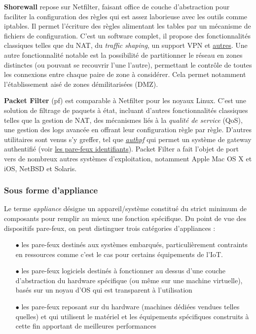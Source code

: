 \documentclass[]{article}
\newcommand{\minit}[1]{\noindent{\small\textbf{ \underline{#1}}}\vspace{0.2cm}}
\begin{document}
\par \textbf{Shorewall} repose sur Netfilter, faisant office de couche d'abstraction pour faciliter la configuration des règles qui est assez laborieuse avec les outils comme iptables. Il permet l'écriture des règles alimentant les tables par un mécanisme de fichiers de configuration. C'est un software complet, il propose des fonctionnalités classiques telles que du NAT, du \textit{traffic shaping}, un support VPN et \href{http://www.shorewall.net/shorewall_features.htm}{autres}. Une autre fonctionnalité notable est la possibilité de partitionner le réseau en zones distinctes (ou pouvant se recouvrir l'une l'autre), permettant le contrôle de toutes les connexions entre chaque paire de zone à considérer. Cela permet notamment l'établissement aisé de zones démilitarisées (DMZ).\\ 

\minit{BSD}  

\par \textbf{Packet Filter} (pf) est comparable à Netfilter pour les noyaux Linux. C'est une solution de filtrage de paquets à état, incluant d'autres fonctionnalités classiques telles que la gestion de NAT, des mécanismes liés à la \textit{qualité de service} (QoS), une gestion des logs avancée en offrant leur configuration règle par règle. D'autres utilitaires sont venus s'y greffer, tel que \href{https://www.openbsd.org/faq/pf/authpf.html}{\textit{authpf}} qui permet un système de gateway authentifié (voir \hyperref[idfw]{les pare-feux identifiants}). Packet Filter a fait l'objet de port vers de nombreux autres systèmes d'exploitation, notamment Apple Mac OS X et iOS, NetBSD et Solaris.

\newpage

\subsubsection{Sous forme d'appliance}

Le terme \textit{appliance} désigne un appareil/système constitué du strict minimum de composants pour remplir au mieux une fonction spécifique. Du point de vue des dispositifs pare-feux, on peut distinguer trois catégories d'appliances :
\begin{itemize}
\vspace{0.2cm}
\item[$\bullet$] les pare-feux destinés aux systèmes embarqués, particulièrement contraints en ressources comme c'est le cas pour certains équipements de l'IoT.  
\vspace{0.2cm}
\item[$\bullet$] les pare-feux logiciels destinés à fonctionner au dessus d'une couche d'abstraction du hardware spécifique (ou même sur une machine virtuelle), basés sur un noyau d'OS qui est transparent à l'utilisation
\vspace{0.2cm}
\item[$\bullet$] les pare-feux reposant sur du hardware (machines dédiées vendues telles quelles) et qui utilisent le matériel et les équipements spécifiques construits à cette fin apportant de meilleures performances
\end{itemize}
\vspace{0.2cm}
\end{document}
